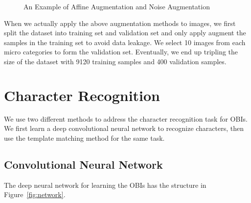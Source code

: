 \documentclass[journal]{IEEEtran}
\begin{document}
\begin{figure}[h]
\begin{minipage}{0.2\linewidth}
{		}
	\end{minipage}
	\begin{minipage}{0.2\linewidth}
	\end{minipage}
	\caption{An Example of Affine Augmentation and Noise Augmentation}
	\label{fig:aug-example}
\end{figure}

When we actually apply the above augmentation methods to images, we first split the dataset into training set and validation set and only apply augment the samples in the training set to avoid data leakage.
We select 10 images from each micro categories to form the validation set.
Eventually, we end up tripling the size of the dataset with 9120 training samples and 400 validation samples.

\section{Character Recognition}
We use two different methods to address the character recognition task for OBIs.
We first learn a deep convolutional neural network to recognize characters, then use the template matching method for the same task.

\subsection{Convolutional Neural Network}
The deep neural network for learning the OBIs has the structure in Figure~\ref{fig:network}.
\end{document}
